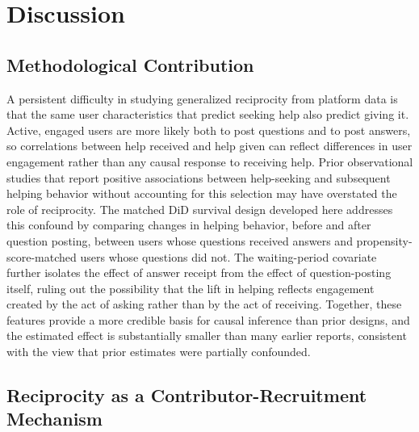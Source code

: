 \section{Discussion}
\label{sec:discussion}

\subsection{Methodological Contribution}

A persistent difficulty in studying generalized reciprocity from platform data is that the same user characteristics that predict seeking help also predict giving it. Active, engaged users are more likely both to post questions and to post answers, so correlations between help received and help given can reflect differences in user engagement rather than any causal response to receiving help. Prior observational studies that report positive associations between help-seeking and subsequent helping behavior without accounting for this selection \citep{baker_paying_2014, chen_engaging_2018, joyce_predicting_2006} may have overstated the role of reciprocity. The matched DiD survival design developed here addresses this confound by comparing changes in helping behavior, before and after question posting, between users whose questions received answers and propensity-score-matched users whose questions did not. The waiting-period covariate further isolates the effect of answer receipt from the effect of question-posting itself, ruling out the possibility that the lift in helping reflects engagement created by the act of asking rather than by the act of receiving. Together, these features provide a more credible basis for causal inference than prior designs, and the estimated effect is substantially smaller than many earlier reports, consistent with the view that prior estimates were partially confounded.

\subsection{Reciprocity as a Contributor-Recruitment Mechanism}

